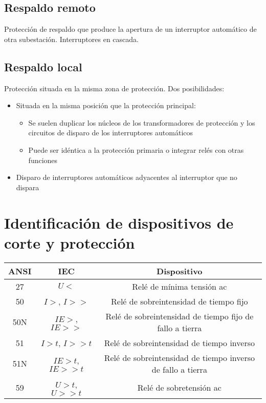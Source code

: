 \subsection{Respaldo remoto}
Protección de respaldo que produce la apertura de un interruptor automático de otra subestación. Interruptores en cascada.
\subsection{Respaldo local}
Protección situada en la misma zona de protección. Dos posibilidades:
\begin{itemize}
	\item Situada en la misma posición que la protección principal:
	\begin{itemize}
		\item Se suelen duplicar los núcleos de los transformadores de protección y los circuitos de disparo de los interruptores automáticos
		\item Puede ser idéntica a la protección primaria o integrar relés con otras funciones
	\end{itemize}
	\item Disparo de interruptores automáticos adyacentes al interruptor que no dispara
\end{itemize}
\section{Identificación de dispositivos de corte y protección}
\begin{table}[H]
	\centering
	\begin{tabular}{|c|c|c|}
		\hline
		\textbf{ANSI} & \textbf{IEC} & \textbf{Dispositivo} \\ \hline
		27 & $U<$ & Relé de mínima tensión ac \\ \hline
		50 & $I>$, $I>>$ & Relé de sobreintensidad de tiempo fijo \\ \hline
		50N & $IE>$, $IE>>$ & Relé de sobreintensidad de tiempo fijo de fallo a tierra \\ \hline
		51 & $I>t$, $I>>t$ & Relé de sobreintensidad de tiempo inverso \\ \hline
		51N & $IE>t$, $IE>>t$ & Relé de sobreintensidad de tiempo inverso de fallo a tierra \\ \hline
		59 & $U>t$, $U>>t$ & Relé de sobretensión ac \\ \hline
	\end{tabular}
	\label{tab:protection_devices}
\end{table}